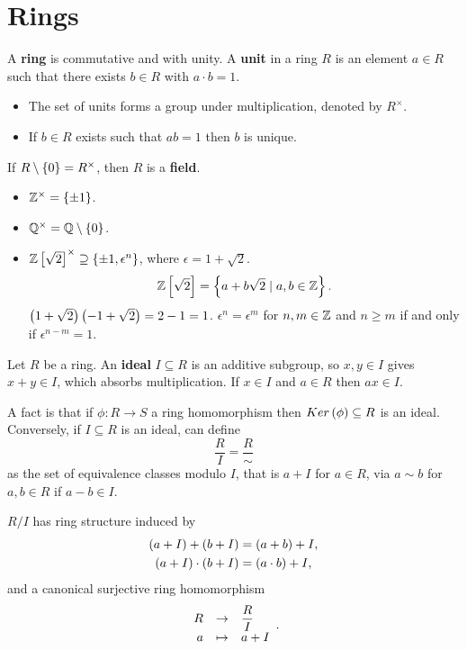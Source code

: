 
\section{Rings}

\begin{definition}
A \textbf{ring} is commutative and with unity. A \textbf{unit} in a ring $ R $ is an element $ a \in R $ such that there exists $ b \in R $ with $ a \cdot b = 1 $.
\begin{itemize}
\item The set of units forms a group under multiplication, denoted by $ R^\times $.
\item If $ b \in R $ exists such that $ ab = 1 $ then $ b $ is unique.
\end{itemize}
If $ R \setminus \left\{ 0 \right\} = R^\times $, then $ R $ is a \textbf{field}.
\end{definition}

\begin{example1}
\hfill
\begin{itemize}
\item $ \mathbb{Z}^\times = \left\{ \pm 1 \right\} $.
\item $ \mathbb{Q}^\times = \mathbb{Q} \setminus \left\{ 0 \right\} $.
\item $ \mathbb{Z}\left[ \sqrt{2} \right]^\times \supseteq \left\{ \pm 1, \epsilon^n \right\} $, where $ \epsilon = 1 + \sqrt{2} $.
$$ \mathbb{Z}\left[ \sqrt{2} \right] = \left\{ a + b\sqrt{2} \mid a, b \in \mathbb{Z} \right\}. $$
$ \left( 1 + \sqrt{2} \right)\left( -1 + \sqrt{2} \right) = 2 - 1 = 1 $. $ \epsilon^n = \epsilon^m $ for $ n, m \in \mathbb{Z} $ and $ n \ge m $ if and only if $ \epsilon^{n - m} = 1 $.
\end{itemize}
\end{example1}

\begin{definition}
Let $ R $ be a ring. An \textbf{ideal} $ I \subseteq R $ is an additive subgroup, so $ x, y \in I $ gives $ x + y \in I $, which absorbs multiplication. If $ x \in I $ and $ a \in R $ then $ ax \in I $.
\end{definition}

A fact is that if $ \phi : R \to S $ a ring homomorphism then $ Ker\left( \phi \right) \subseteq R $ is an ideal. Conversely, if $ I \subseteq R $ is an ideal, can define
$$ \dfrac{R}{I} = \dfrac{R}{\sim} $$
as the set of equivalence classes modulo $ I $, that is $ a + I $ for $ a \in R $, via $ a \sim b $ for $ a, b \in R $ if $ a - b \in I $.

\begin{proposition}
$ R / I $ has ring structure induced by
\begin{align*}
\left( a + I \right) + \left( b + I \right) & = \left( a + b \right) + I, \\
\left( a + I \right) \cdot \left( b + I \right) & = \left( a \cdot b \right) + I,
\end{align*}
and a canonical surjective ring homomorphism
$$ \function{R}{\dfrac{R}{I}}{a}{a + I}. $$
\end{proposition}

